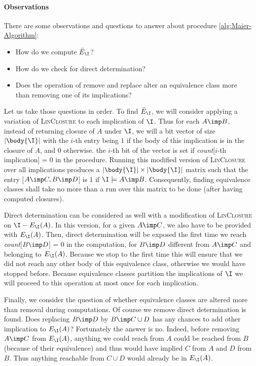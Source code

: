 \vspace{1.2em}

\paragraph{Observations} There are some observations and questions to answer
about procedure \ref{alg:Maier-Algorithm}:
\begin{itemize}
	\item How do we compute $\bar{E}_{\I}$?
	\item How do we check for direct determination?
	\item Does the operation of remove and replace alter an equivalence class 
	more than removing one of its implications?
\end{itemize}  
\noindent Let us take those questions in order. To find $\bar{E}_{\I}$, we 
will consider applying a variation of \textsc{LinClosure} to each implication
of $\I$. Thus for each $A \imp B$, instead of returning closure of $A$ under
$\I$, we will a bit vector of size $|\body{\I}|$ with the $i$-th entry being
$1$ if the body of this implication is in the closure of $A$, and $0$ otherwise.
the $i$-th bit of the vector is set if \textit{count}[$i$-th implication] = 0 in
the procedure. Running this modified version of \textsc{LinClosure} over all
implications produces a $|\body{\I}| \times |\body{\I}|$ matrix such that
the entry [$A \imp C, B \imp D$] is 1 if $\I \models A \imp B$. Consequently,
finding equivalence classes shall take no more than a run over this matrix to 
be done (after having computed closures).

\vspace{1.2em}

Direct determination can be considered as well with a modification of 
\textsc{LinClosure} on $\I - E_{\I}(A)$. In this version, for a given $A \imp 
C$, we also have to be provided with $E_{\I}(A)$. Then, direct determination 
will be exposed the first time we reach \textit{count}[$B \imp D$] = 0 in the 
computation, for $B \imp D$ different from $A \imp C$ and belonging to 
$E_{\I}(A)$. Because we stop to the first time this will ensure that we did not 
reach any other body of this equivalence class, otherwise we would have stopped 
before. Because equivalence classes partition the implications of $\I$ we will 
proceed to this operation at most once for each implication.

\vspace{1.2em}

Finally, we consider the question of whether equivalence classes are altered 
more than removal during computations. Of course we remove direct determination
is found. Does replacing $B \imp D$ by $B \imp C \cup D$ has any chances to 
add other implication to $E_{\I}(A)$? Fortunately the answer is no. Indeed, 
before removing $A \imp C$ from $E_{\I}(A)$, anything we could reach from $A$
could be reached from $B$ (because of their equivalence) and thus would have
implied $C$ from $A$ and $D$ from $B$. Thus anything reachable from $C \cup D$
would already be in $E_{\I}(A)$.

